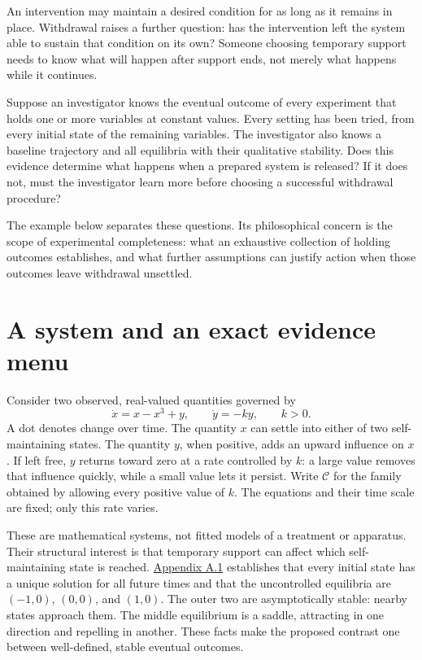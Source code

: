 \noindent An intervention may maintain a desired condition for as long as it remains in place. Withdrawal raises a further question: has the intervention left the system able to sustain that condition on its own? Someone choosing temporary support needs to know what will happen after support ends, not merely what happens while it continues.

Suppose an investigator knows the eventual outcome of every experiment that holds one or more variables at constant values. Every setting has been tried, from every initial state of the remaining variables. The investigator also knows a baseline trajectory and all equilibria with their qualitative stability. Does this evidence determine what happens when a prepared system is released? If it does not, must the investigator learn more before choosing a successful withdrawal procedure?

The example below separates these questions. Its philosophical concern is the scope of experimental completeness: what an exhaustive collection of holding outcomes establishes, and what further assumptions can justify action when those outcomes leave withdrawal unsettled.

\section*{A system and an exact evidence menu}

Consider two observed, real-valued quantities governed by
\[
\dot x=x-x^3+y,\qquad \dot y=-ky,\qquad k>0.
\tag{1}
\]
A dot denotes change over time. The quantity \(x\) can settle into either of two self-maintaining states. The quantity \(y\), when positive, adds an upward influence on \(x\). If left free, \(y\) returns toward zero at a rate controlled by \(k\): a large value removes that influence quickly, while a small value lets it persist. Write \(\mathcal C\) for the family obtained by allowing every positive value of \(k\). The equations and their time scale are fixed; only this rate varies.

These are mathematical systems, not fitted models of a treatment or apparatus. Their structural interest is that temporary support can affect which self-maintaining state is reached. \hyperref[app:a.1]{Appendix A.1} establishes that every initial state has a unique solution for all future times and that the uncontrolled equilibria are \((-1,0)\), \((0,0)\), and \((1,0)\). The outer two are asymptotically stable: nearby states approach them. The middle equilibrium is a saddle, attracting in one direction and repelling in another. These facts make the proposed contrast one between well-defined, stable eventual outcomes.

